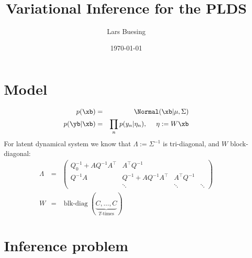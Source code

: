 \documentclass[10pt,english]{article}
\title{Variational Inference for the PLDS}
\author{Lars Buesing}
\date{\today}
\begin{document}
\maketitle

\section{Model}

\begin{eqnarray}
 p(\xb)				&=&	\Normal(\xb\vert \mu,\Sigma)\\
 p(\yb\vert \xb)		&=&	\prod_{n}	p(y_n\vert \eta_n), \ \ \ \ \eta:=W\xb
\end{eqnarray}
For latent dynamical system we know that $\Lambda:=\Sigma^{-1}$ is tri-diagonal, and $W$ block-diagonal:
\begin{eqnarray}
 \Lambda	&=&	\begin{pmatrix} Q_0^{-1}+AQ^{-1}A^\top	&	A^\top Q^{-1}		& \\
					Q^{-1}A			&	Q^{-1}+AQ^{-1}A^\top 	&  A^\top Q^{-1}\\
								&	\ddots			& \ddots		& \ddots
        	   	\end{pmatrix}\\
 W		&=&	\operatorname{blk-diag}(\underbrace{C,\ldots,C}_{T\mbox{-times}})
\end{eqnarray}



\section{Inference problem}
\end{document}
